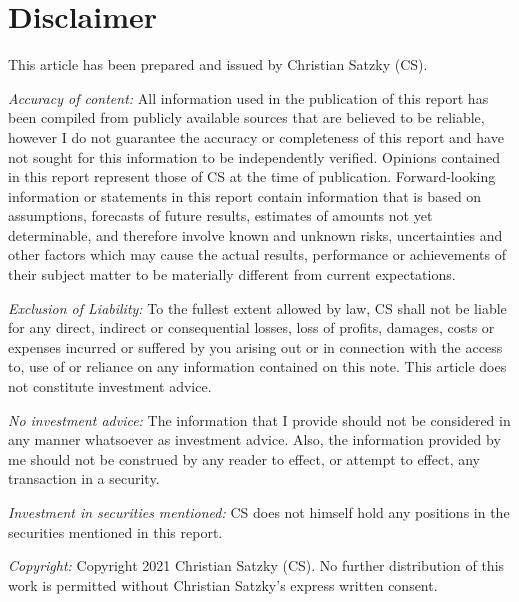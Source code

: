 \documentclass[
  12pt,
]{article}
\begin{document}
\newpage

\hypertarget{disclaimer}{%
\section*{Disclaimer}\label{disclaimer}}

This article has been prepared and issued by Christian Satzky (CS).

\emph{Accuracy of content:} All information used in the publication of
this report has been compiled from publicly available sources that are
believed to be reliable, however I do not guarantee the accuracy or
completeness of this report and have not sought for this information to
be independently verified. Opinions contained in this report represent
those of CS at the time of publication. Forward-looking information or
statements in this report contain information that is based on
assumptions, forecasts of future results, estimates of amounts not yet
determinable, and therefore involve known and unknown risks,
uncertainties and other factors which may cause the actual results,
performance or achievements of their subject matter to be materially
different from current expectations.

\emph{Exclusion of Liability:} To the fullest extent allowed by law, CS
shall not be liable for any direct, indirect or consequential losses,
loss of profits, damages, costs or expenses incurred or suffered by you
arising out or in connection with the access to, use of or reliance on
any information contained on this note. This article does not constitute
investment advice.

\emph{No investment advice:} The information that I provide should not
be considered in any manner whatsoever as investment advice. Also, the
information provided by me should not be construed by any reader to
effect, or attempt to effect, any transaction in a security.

\emph{Investment in securities mentioned:} CS does not himself hold any
positions in the securities mentioned in this report.

\emph{Copyright:} Copyright 2021 Christian Satzky (CS). No further
distribution of this work is permitted without Christian Satzky's
express written consent.
\end{document}
